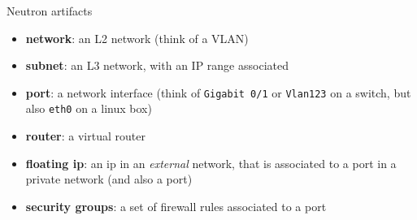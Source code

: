\documentclass[english,serif,mathserif,xcolor=pdftex,dvipsnames,table]{beamer}
\begin{document}
\begin{frame}
  {Neutron artifacts}
  \begin{itemize}
  \item \textbf{network}: an L2 network (think of a VLAN)
  \item \textbf{subnet}: an L3 network, with an IP range associated
  \item \textbf{port}: a network interface (think of \texttt{Gigabit 0/1}
    or \texttt{Vlan123} on a switch, but also \texttt{eth0} on a linux box)
  \item \textbf{router}: a virtual router
  \item \textbf{floating ip}: an ip in an \textit{external} network,
    that is associated to a port in a private network (and also a port)
  \item \textbf{security groups}: a set of firewall rules associated
    to a port
  \end{itemize}
\end{frame}


\end{document}
